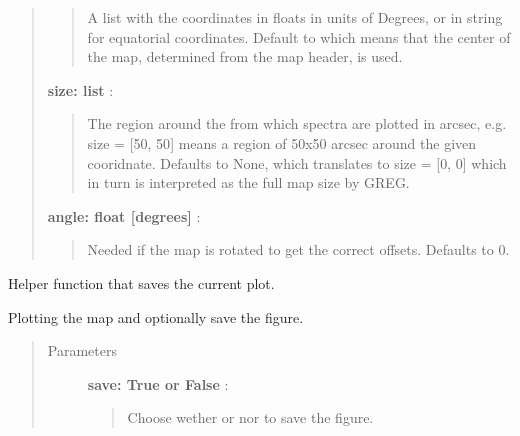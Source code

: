 \documentclass[a4paper,10pt,english]{sphinxmanual}
\begin{document}
\begin{fulllineitems}
\begin{fulllineitems}
\begin{quote}
\begin{description}
\begin{quote}
A list with the coordinates in floats in units of Degrees, or in
string for equatorial coordinates. Default to  which means
that the center of the map, determined from the map header, is
used.
\end{quote}

\textbf{size: list} :
\begin{quote}

The region around the  from which spectra are plotted
in arcsec, e.g. size = {[}50, 50{]} means a region of 50x50 arcsec
around the given cooridnate. Defaults to None, which translates to
size = {[}0, 0{]} which in turn is interpreted as  the full map size 
by GREG.
\end{quote}

\textbf{angle: float {[}degrees{]}} :
\begin{quote}

Needed if the map is rotated to get the correct offsets. Defaults
to 0.
\end{quote}

\end{description}\end{quote}

\end{fulllineitems}


\begin{fulllineitems}
\label{maps:astrolyze.maps.gildas.GildasMap.save_figure}
Helper function that saves the current plot.

\end{fulllineitems}


\begin{fulllineitems}
\label{maps:astrolyze.maps.gildas.GildasMap.quick_preview}
Plotting the map and optionally save the figure.
\begin{quote}\begin{description}
\item[{Parameters }] \leavevmode
\textbf{save: True or False} :
\begin{quote}

Choose wether or nor to save the figure.
\end{quote}


\end{description}
\end{quote}
\end{fulllineitems}
\end{fulllineitems}
\end{document}
